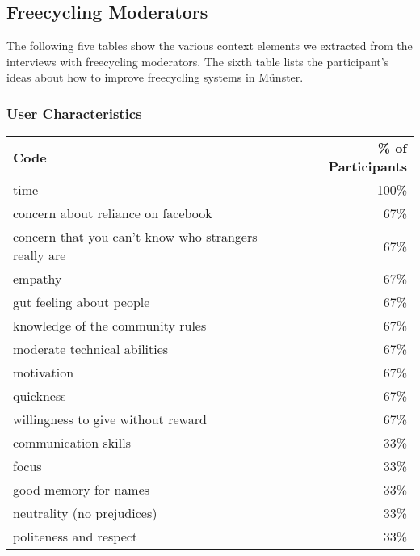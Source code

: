 \subsection{Freecycling Moderators}

The following five tables show the various context elements we extracted from the interviews with freecycling moderators. The sixth table lists the participant's ideas about how to improve freecycling systems in Münster.

\subsubsection*{User Characteristics}

\begin{longtable}{p{}r}
\textbf{Code}                                        & \textbf{\% of Participants} \\
time                                                 & 100\%                       \\
concern about reliance on facebook                   & 67\%                        \\
concern that you can't know who strangers really are & 67\%                        \\
empathy                                              & 67\%                        \\
gut feeling about people                             & 67\%                        \\
knowledge of the community rules                     & 67\%                        \\
moderate technical abilities                         & 67\%                        \\
motivation                                           & 67\%                        \\
quickness                                            & 67\%                        \\
willingness to give without reward                   & 67\%                        \\
communication skills                                 & 33\%                        \\
focus                                                & 33\%                        \\
good memory for names                                & 33\%                        \\
neutrality (no prejudices)                           & 33\%                        \\
politeness and respect                               & 33\%
\end{longtable}

